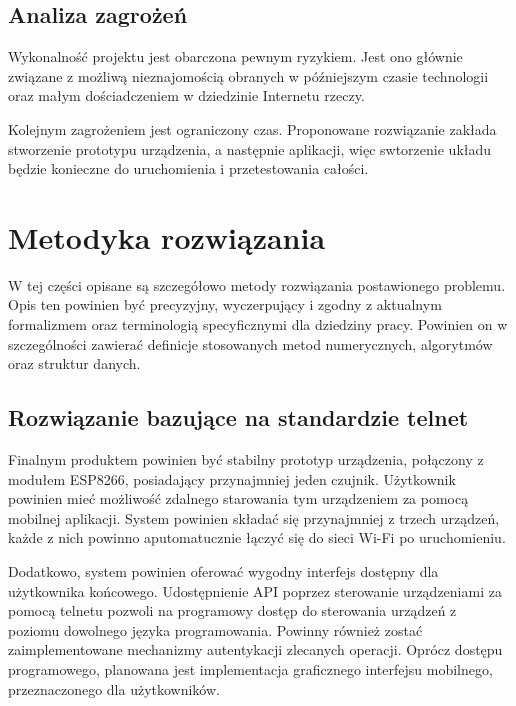 \subsection{Analiza zagrożeń}
Wykonalność projektu jest obarczona pewnym ryzykiem. Jest ono głównie związane z możliwą nieznajomością obranych w późniejszym czasie technologii oraz małym dościadczeniem w dziedzinie Internetu rzeczy.

Kolejnym zagrożeniem jest ograniczony czas. Proponowane rozwiązanie zakłada stworzenie prototypu urządzenia, a następnie aplikacji, więc swtorzenie układu będzie konieczne do uruchomienia i przetestowania całości.


\section{Metodyka rozwiązania}
\label{sec:metodyka-rozwiazania}
W tej części opisane są szczegółowo metody rozwiązania postawionego problemu. Opis ten powinien być precyzyjny, wyczerpujący i zgodny z aktualnym formalizmem oraz terminologią specyficznymi dla dziedziny pracy. Powinien on w szczególności zawierać definicje stosowanych metod numerycznych, algorytmów oraz struktur danych.

\subsection{Rozwiązanie bazujące na standardzie telnet}
Finalnym produktem powinien być stabilny prototyp urządzenia, połączony z modułem ESP8266, posiadający przynajmniej jeden czujnik. Użytkownik powinien mieć możliwość zdalnego starowania tym urządzeniem za pomocą mobilnej aplikacji. System powinien składać się przynajmniej z trzech urządzeń, każde z nich powinno aputomatucznie łączyć się do sieci Wi-Fi po uruchomieniu. 

Dodatkowo, system powinien oferować wygodny interfejs dostępny dla użytkownika końcowego. Udostępnienie API poprzez sterowanie urządzeniami za pomocą telnetu pozwoli na programowy dostęp do sterowania urządzeń z poziomu dowolnego języka programowania. Powinny również zostać zaimplementowane mechanizmy autentykacji zlecanych operacji. Oprócz dostępu programowego, planowana jest implementacja graficznego interfejsu mobilnego, przeznaczonego dla użytkowników\cite{kukdm-art}.

